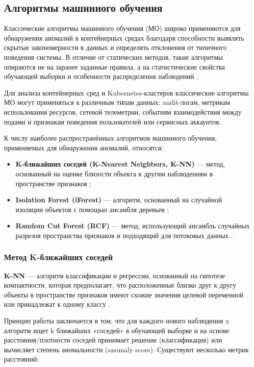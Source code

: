 \subsection{Алгоритмы машинного обучения}

Классические алгоритмы машинного обучения (МО) широко применяются для обнаружения аномалий в контейнерных средах благодаря способности выявлять скрытые закономерности в данных и определять отклонения от типичного поведения системы. В отличие от статических методов, такие алгоритмы опираются не на заранее заданные правила, а на статистические свойства обучающей выборки и особенности распределения наблюдений \cite{AD_Survey}.

Для анализа контейнерных сред и Kubernetes-кластеров классические алгоритмы МО могут применяться к различным типам данных: audit-логам, метрикам использования ресурсов, сетевой телеметрии, событиям взаимодействия между подами и признакам поведения пользователей или сервисных аккаунтов.

К числу наиболее распространённых алгоритмов машинного обучения, применяемых для обнаружения аномалий, относятся:

\begin{itemize}
    \item \textbf{K-ближайших соседей (K-Nearest Neighbors, K-NN)} — метод, основанный на оценке близости объекта к другим наблюдениям в пространстве признаков \cite{knn};
    \item \textbf{Isolation Forest (iForest)} — алгоритм, основанный на случайной изоляции объектов с помощью ансамбля деревьев \cite{iForest};
    \item \textbf{Random Cut Forest (RCF)} — метод, использующий ансамбль случайных разрезов пространства признаков и подходящий для потоковых данных \cite{RCF}.
\end{itemize}

\subsubsection{Метод K-ближайших соседей}

\textbf{K-NN} — алгоритм классификации и регрессии, основанный на гипотезе компактности, которая предполагает, что расположенные близко друг к другу объекты в пространстве признаков имеют схожие значения целевой переменной или принадлежат к одному классу \cite{knn}.

Принцип работы заключается в том, что для каждого нового наблюдения x алгоритм ищет k ближайших «соседей» в обучающей выборке и на основе расстояния/плотности соседей принимает решение (классификация) или вычисляет степень аномальности (anomaly score). Существуют несколько метрик расстояний:

